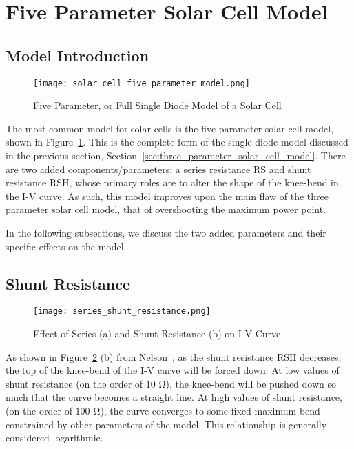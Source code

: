 \section{Five Parameter Solar Cell Model}\label{sec:five_parameter_solar_cell_model}

\subsection{Model Introduction}\label{subsec:five_param_model_introduction}

\begin{figure}[h]
    \texttt{[image: solar\_cell\_five\_parameter\_model.png]}
    \caption{Five Parameter, or Full Single Diode Model of a Solar Cell}
    \label{fig:single_diode_model_with_resistances}
\end{figure}

The most common model for solar cells is the five parameter solar cell model,
shown in Figure~\ref{fig:single_diode_model_with_resistances}. This is the
complete form of the single diode model discussed in the previous section,
Section~\ref{sec:three_parameter_solar_cell_model}. There are two added
components/parameters: a series resistance \ac{RS} and shunt resistance
\ac{RSH}, whose primary roles are to alter the shape of the knee-bend in the I-V
curve. As such, this model improves upon the main flaw of the three parameter
solar cell model, that of overshooting the maximum power point.

In the following subsections, we discuss the two added parameters and their
specific effects on the model.


\subsection{Shunt Resistance}\label{subsec:five_param_shunt_resistance}

\begin{figure}[h]
    \texttt{[image: series\_shunt\_resistance.png]}
    \caption{Effect of Series (a) and Shunt Resistance (b) on \ac{I-V} Curve}
    \label{fig:series_shunt_resistance}
\end{figure}

As shown in Figure~\ref{fig:series_shunt_resistance} (b) from
Nelson~\cite{nelson}, as the shunt resistance \ac{RSH} decreases, the top of the
knee-bend of the \ac{I-V} curve will be forced down. At low values of shunt
resistance (on the order of $10$ $\si{\ohm}$), the knee-bend will be pushed down
so much that the curve becomes a straight line. At high values of shunt
resistance, (on the order of $100$ $\si{\ohm}$), the curve converges to some
fixed maximum bend constrained by other parameters of the model. This
relationship is generally considered logarithmic.

